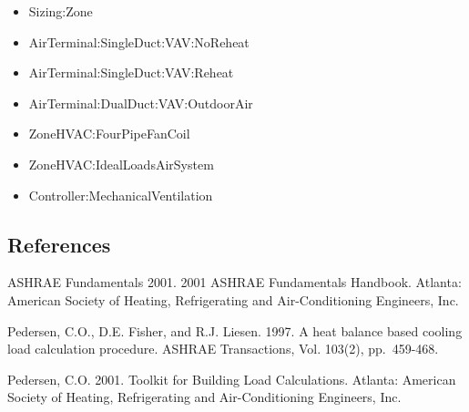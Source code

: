 \begin{itemize}
\item
  Sizing:Zone
\item
  AirTerminal:SingleDuct:VAV:NoReheat
\item
  AirTerminal:SingleDuct:VAV:Reheat
\item
  AirTerminal:DualDuct:VAV:OutdoorAir
\item
  ZoneHVAC:FourPipeFanCoil
\item
  ZoneHVAC:IdealLoadsAirSystem
\item
  Controller:MechanicalVentilation
\end{itemize}

\subsection{References}\label{references-058}

ASHRAE Fundamentals 2001. 2001 ASHRAE Fundamentals Handbook. Atlanta: American Society of Heating, Refrigerating and Air-Conditioning Engineers, Inc.

Pedersen, C.O., D.E. Fisher, and R.J. Liesen. 1997. A heat balance based cooling load calculation procedure. ASHRAE Transactions, Vol. 103(2), pp.~459-468.

Pedersen, C.O. 2001. Toolkit for Building Load Calculations. Atlanta: American Society of Heating, Refrigerating and Air-Conditioning Engineers, Inc.
